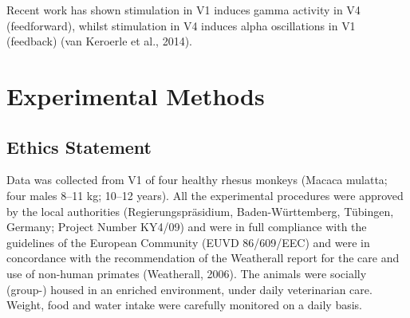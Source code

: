 Recent work has shown stimulation in \ac{V1} induces gamma activity in \ac{V4} (feedforward), whilst stimulation in \ac{V4} induces alpha oscillations in \ac{V1} (feedback) (van Keroerle et al., 2014).
\section{Experimental Methods}
\subsection{Ethics Statement}
Data was collected from \ac{V1} of four healthy rhesus monkeys (Macaca mulatta; four males 8--11 kg; 10--12 years).
All the experimental procedures were approved by the local authorities (Regierungspr\"asidium, Baden-W\"urttemberg, T\"ubingen, Germany; Project Number KY4/09) and were in full compliance with the guidelines of the European Community (EUVD 86/609/EEC) and were in concordance with the recommendation of the Weatherall report for the care and use of non-human primates (Weatherall, 2006).
The animals were socially (group-) housed in an enriched environment, under daily veterinarian care.
Weight, food and water intake were carefully monitored on a daily basis.

